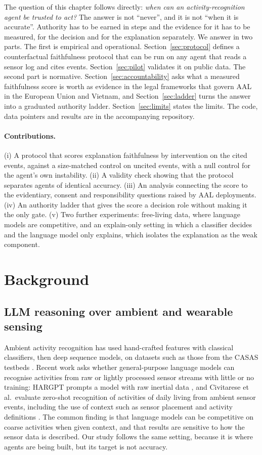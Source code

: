 \documentclass[11pt,a4paper]{article}
\begin{document}
The question of this chapter follows directly: \emph{when can an activity-recognition agent be trusted to act?} The answer is not ``never'', and it is not ``when it is accurate''. Authority has to be earned in steps and the evidence for it has to be measured, for the decision and for the explanation separately. We answer in two parts. The first is empirical and operational. Section~\ref{sec:protocol} defines a counterfactual faithfulness protocol that can be run on any agent that reads a sensor log and cites events. Section~\ref{sec:pilot} validates it on public data. The second part is normative. Section~\ref{sec:accountability} asks what a measured faithfulness score is worth as evidence in the legal frameworks that govern AAL in the European Union and Vietnam, and Section~\ref{sec:ladder} turns the answer into a graduated authority ladder. Section~\ref{sec:limits} states the limits. The code, data pointers and results are in the accompanying repository.

\paragraph{Contributions.}
(i) A protocol that scores explanation faithfulness by intervention on the cited events, against a size-matched control on uncited events, with a null control for the agent's own instability. (ii) A validity check showing that the protocol separates agents of identical accuracy. (iii) An analysis connecting the score to the evidentiary, consent and responsibility questions raised by AAL deployments. (iv) An authority ladder that gives the score a decision role without making it the only gate. (v) Two further experiments: free-living data, where language models are competitive, and an explain-only setting in which a classifier decides and the language model only explains, which isolates the explanation as the weak component.

\section{Background}
\label{sec:background}

\subsection{LLM reasoning over ambient and wearable sensing}
Ambient activity recognition has used hand-crafted features with classical classifiers, then deep sequence models, on datasets such as those from the CASAS testbeds \cite{cook2013casas}. Recent work asks whether general-purpose language models can recognise activities from raw or lightly processed sensor streams with little or no training: HARGPT prompts a model with raw inertial data \cite{ji2024hargpt}, and Civitarese et al.\ evaluate zero-shot recognition of activities of daily living from ambient sensor events, including the use of context such as sensor placement and activity definitions \cite{civitarese2024zeroshot}. The common finding is that language models can be competitive on coarse activities when given context, and that results are sensitive to how the sensor data is described. Our study follows the same setting, because it is where agents are being built, but its target is not accuracy.
\end{document}
